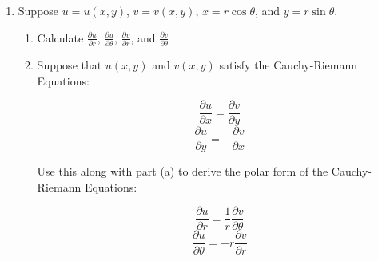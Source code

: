 \documentclass[12pt]{article}
\newif\ifans
\begin{document}
\begin{enumerate}
\ifans{\fbox{\parbox{1\linewidth}{We can express $g$ as $g=f(x,y,z)$, where $x=u-v$, $y=v-w$, and $z=w-u$.  Then, we compute the partial derivatives of $g$ with respect to $u$, $v$, and $w$.

$$\frac{\partial g}{\partial u}=f_x(u-v,v-w,w-u)-f_z(u-v,v-w,w-u)$$
$$\frac{\partial g}{\partial v}=-f_x(u-v,v-w,w-u)+f_y(u-v,v-w,w-u)$$
$$\frac{\partial g}{\partial w}=-f_y(u-v,v-w,w-u)+f_z(u-v,v-w,w-u)$$

Summing these three partial derivatives yields 0.}}} \fi

\item Suppose $u=u(x,y)$, $v=v(x,y)$, $x=r\cos{\theta}$, and $y=r\sin{\theta}$.

\begin{enumerate}

\item Calculate $\frac{\partial u}{\partial r}$, $\frac{\partial u}{\partial \theta}$, $\frac{\partial v}{\partial r}$, and $\frac{\partial v}{\partial \theta}$

\ifans{\fbox{\parbox{0.7\linewidth}{$\frac{\partial u}{\partial r}=\frac{\partial u}{\partial x}\cos{\theta}+\frac{\partial u}{\partial y}\sin{\theta}$; $\frac{\partial u}{\partial \theta}=-r\frac{\partial u}{\partial x}\sin{\theta}+r\frac{\partial u}{\partial y}\cos{\theta}$;\\
\\
$\frac{\partial v}{\partial r}=\frac{\partial v}{\partial x}\cos{\theta}+\frac{\partial v}{\partial y}\sin{\theta}$; $\frac{\partial v}{\partial \theta}=-r\frac{\partial v}{\partial x}\sin{\theta}+r\frac{\partial v}{\partial y}\cos{\theta}$}}} \fi

\item Suppose that $u(x,y)$ and $v(x,y)$ satisfy the Cauchy-Riemann Equations:

$$\frac{\partial u}{\partial x}=\frac{\partial v}{\partial y}$$
$$\frac{\partial u}{\partial y}=-\frac{\partial v}{\partial x}$$

Use this along with part (a) to derive the polar form of the Cauchy-Riemann Equations:

$$\frac{\partial u}{\partial r}=\frac{1}{r}\frac{\partial v}{\partial \theta}$$
$$\frac{\partial u}{\partial \theta}=-r\frac{\partial v}{\partial r}$$


\end{enumerate}
\end{enumerate}
\end{document}
